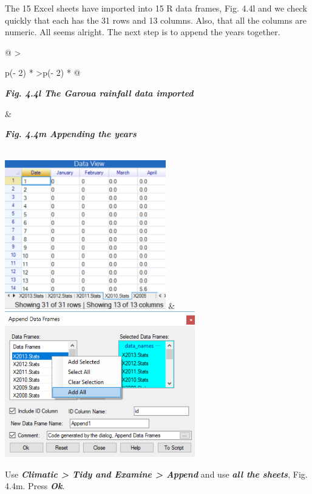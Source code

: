\documentclass[
  letterpaper,
  DIV=11,
  numbers=noendperiod]{scrreprt}
\begin{document}
The 15 Excel sheets have imported into 15 R data frames, Fig. 4.4l and
we check quickly that each has the 31 rows and 13 columns. Also, that
all the columns are numeric. All seems alright. The next step is to
append the years together.

\begin{longtable}[]{@{}
  >{\raggedright\arraybackslash}p{(\columnwidth - 2\tabcolsep) * }
  >{\centering\arraybackslash}p{(\columnwidth - 2\tabcolsep) * }@{}}
\toprule\noalign{}
\begin{minipage}[b]{\linewidth}\raggedright
\textbf{\emph{Fig. 4.4l The Garoua rainfall data imported}}
\end{minipage} & \begin{minipage}[b]{\linewidth}\centering
\textbf{\emph{Fig. 4.4m Appending the years}}
\end{minipage} \\
\midrule\noalign{}
\endhead
\bottomrule\noalign{}
\endlastfoot
\includegraphics[width=2.75543in,height=2.54747in]{figures/Fig4.4l.png}
&
\includegraphics[width=3.26418in,height=2.49398in]{figures/Fig4.4m.png} \\
\end{longtable}

Use \textbf{\emph{Climatic \textgreater{} Tidy and Examine
\textgreater{} Append}} and use \textbf{\emph{all the sheets}}, Fig.
4.4m. Press \textbf{\emph{Ok}}.
\end{document}
